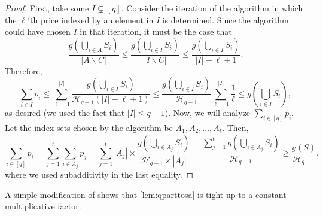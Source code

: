 \documentclass[11pt]{article}%
\numberwithin{theorem}{subsection}
\begin{document}
\begin{proof}
\noindent
First, take some $I\subsetneq [q].$ Consider the iteration of the algorithm in which the $\ell'$th price indexed by an element in $I$ is determined. Since the algorithm could have chosen $I$ in that iteration, it must be the case that  
$$
\frac{g(\bigcup_{i\in A}S_i)}{|A\backslash C|}\le 
\frac{g(\bigcup_{i\in I}S_i)}{|I\backslash C|} \le 
\frac{g(\bigcup_{i\in I}S_i)}{|I|-\ell+1}.
$$
Therefore, 
$$
\sum_{i\in I}p_i \le 
\sum_{\ell = 1}^{|I|}
\frac{g(\bigcup_{i\in I}S_i)}{\mathcal{H}_{q-1}(|I|-\ell+1)}\le 
\frac{g(\bigcup_{i\in I}S_i)}{\mathcal{H}_{q-1}}\sum_{\ell = 1}^{|I|}\frac{1}{\ell} \le
g(\bigcup_{i\in I}S_i),
$$
as desired (we used the fact that $|I|\le q-1$).
Now, we will analyze $\sum_{i\in [q]}p_i.$ Let the index sets chosen by the algorithm be $A_1, A_2, \ldots, A_t.$ Then,
$$
\sum_{i\in [q]}p_i = 
\sum_{j = 1}^t\sum_{i \in A_j}p_j = 
\sum_{j = 1}^t |A_j|\times 
\frac{g(\bigcup_{i\in A_j}S_i)}{\mathcal{H}_{q-1}\times |A_j|} = 
\frac{\sum_{j = 1}^tg(\bigcup_{i\in A_j}S_i)}{\mathcal{H}_{q-1}}\ge 
\frac{g(S)}{\mathcal{H}_{q-1}},
$$
where we used subadditivity in the last equality.
\end{proof}

\noindent
A simple modification of \cite[Appendix C]{BhawalkarR11} shows that \cref{lem:qparttosa} is tight up to a constant multiplicative factor.
\end{document}

